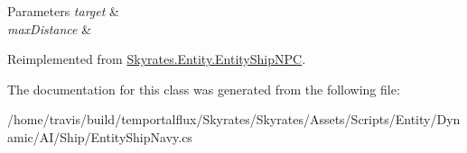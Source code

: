 \begin{DoxyParams}{Parameters}
{\em target} & \\
\hline
{\em max\-Distance} & \\
\hline
\end{DoxyParams}


Reimplemented from \hyperlink{class_skyrates_1_1_entity_1_1_entity_ship_n_p_c_a1953661931867a0b526e56221633263f}{Skyrates.\-Entity.\-Entity\-Ship\-N\-P\-C}.



The documentation for this class was generated from the following file\-:\begin{DoxyCompactItemize}
\item 
/home/travis/build/temportalflux/\-Skyrates/\-Skyrates/\-Assets/\-Scripts/\-Entity/\-Dynamic/\-A\-I/\-Ship/Entity\-Ship\-Navy.\-cs\end{DoxyCompactItemize}
